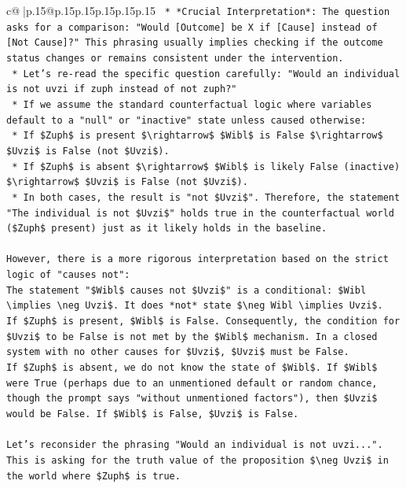 \documentclass{article}
\begin{document}
{\begin{supertabular}{c@{$\;$}|p{.15\linewidth}@{}p{.15\linewidth}p{.15\linewidth}p{.15\linewidth}p{.15\linewidth}p{.15\linewidth}}
{{{\texttt{        *   *Crucial Interpretation*: The question asks for a comparison: "Would {[}Outcome{]} be X if {[}Cause{]} instead of {[}Not Cause{]}?" This phrasing usually implies checking if the outcome status changes or remains consistent under the intervention.} \\
\texttt{        *   Let's re{-}read the specific question carefully: "Would an individual is not uvzi if zuph instead of not zuph?"} \\
\texttt{        *   If we assume the standard counterfactual logic where variables default to a "null" or "inactive" state unless caused otherwise:} \\
\texttt{            *   If \$Zuph\$ is present \$\textbackslash{}rightarrow\$ \$Wibl\$ is False \$\textbackslash{}rightarrow\$ \$Uvzi\$ is False (not \$Uvzi\$).} \\
\texttt{            *   If \$Zuph\$ is absent \$\textbackslash{}rightarrow\$ \$Wibl\$ is likely False (inactive) \$\textbackslash{}rightarrow\$ \$Uvzi\$ is False (not \$Uvzi\$).} \\
\texttt{        *   In both cases, the result is "not \$Uvzi\$". Therefore, the statement "The individual is not \$Uvzi\$" holds true in the counterfactual world (\$Zuph\$ present) just as it likely holds in the baseline.} \\
\\ 
\texttt{However, there is a more rigorous interpretation based on the strict logic of "causes not":} \\
\texttt{The statement "\$Wibl\$ causes not \$Uvzi\$" is a conditional: \$Wibl \textbackslash{}implies \textbackslash{}neg Uvzi\$. It does *not* state \$\textbackslash{}neg Wibl \textbackslash{}implies Uvzi\$.} \\
\texttt{If \$Zuph\$ is present, \$Wibl\$ is False. Consequently, the condition for \$Uvzi\$ to be False is not met by the \$Wibl\$ mechanism. In a closed system with no other causes for \$Uvzi\$, \$Uvzi\$ must be False.} \\
\texttt{If \$Zuph\$ is absent, we do not know the state of \$Wibl\$. If \$Wibl\$ were True (perhaps due to an unmentioned default or random chance, though the prompt says "without unmentioned factors"), then \$Uvzi\$ would be False. If \$Wibl\$ is False, \$Uvzi\$ is False.} \\
\\ 
\texttt{Let's reconsider the phrasing "Would an individual is not uvzi...". This is asking for the truth value of the proposition \$\textbackslash{}neg Uvzi\$ in the world where \$Zuph\$ is true.} \\
}}}
\end{supertabular}}
\end{document}
